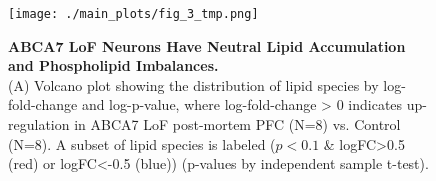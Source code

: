 \begin{figure}[ht]
    \texttt{[image: ./main\_plots/fig\_3\_tmp.png]}  
    \caption{
        \textbf{ABCA7 LoF Neurons Have Neutral Lipid Accumulation and Phospholipid Imbalances.}\\[1ex]
        (A) Volcano plot showing the distribution of lipid species by log-fold-change and log-p-value, where log-fold-change > 0 indicates up-regulation in ABCA7 LoF post-mortem PFC (N=8) vs. Control (N=8). A subset of lipid species is labeled ($p<0.1$ \& logFC>0.5 (red) or logFC<-0.5 (blue)) (p-values by independent sample t-test). 
}
\end{figure}
